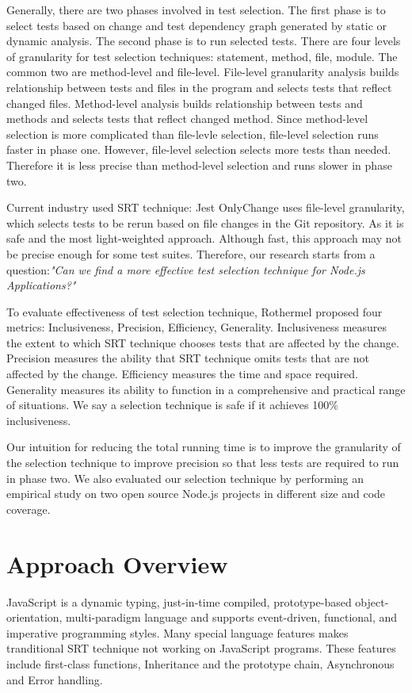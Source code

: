 \documentclass[10pt, conference]{IEEEtran}
\begin{document}
Generally, there are two phases involved in test selection. The first phase is to select tests based on change and 
test dependency graph generated by static or dynamic analysis. The second phase is to run selected tests.
There are four levels of granularity for test selection techniques: statement, method, file, module. The common 
two are method-level and file-level. File-level granularity analysis builds relationship between tests and files in 
the program and selects tests that reflect changed files. Method-level analysis builds relationship between tests and methods 
and selects tests that reflect changed method. Since method-level selection is more complicated than 
file-levle selection, file-level selection runs faster in phase one. However, file-level selection selects more 
tests than needed. Therefore it is less precise than method-level selection and runs slower in phase two. 

Current industry used SRT technique: Jest OnlyChange uses file-level granularity, which selects 
tests to be rerun based on file changes in the Git repository. As it is safe and the most light-weighted approach. Although fast, this approach may not be precise 
enough for some test suites. Therefore, our research starts from a question:\textit{"Can we find a more 
effective test selection technique for Node.js Applications?"} 

To evaluate effectiveness of test selection technique, Rothermel\cite{b13} proposed four metrics: Inclusiveness, Precision, Efficiency, Generality. Inclusiveness 
measures the extent to which SRT technique chooses tests that are affected by the change. Precision measures 
the ability that SRT technique omits tests that are not affected by the change. Efficiency measures the time and 
space required. Generality measures its ability to function in a comprehensive and practical range of situations.
We say a selection technique is safe if it achieves 100\% inclusiveness.

Our intuition for reducing the total running time is to 
improve the granularity of the selection technique to improve precision so that less tests are required to run in phase two. 
We also evaluated our selection technique by performing an empirical study on two open source Node.js projects in different 
size and code coverage.

\section{Approach Overview}
JavaScript is a dynamic typing, just-in-time compiled, prototype-based object-orientation, multi-paradigm language and supports
event-driven, functional, and imperative programming styles. Many special language features makes tranditional SRT technique
not working on JavaScript programs. These features include first-class functions, Inheritance and the prototype chain, Asynchronous and Error handling. 
\end{document}
